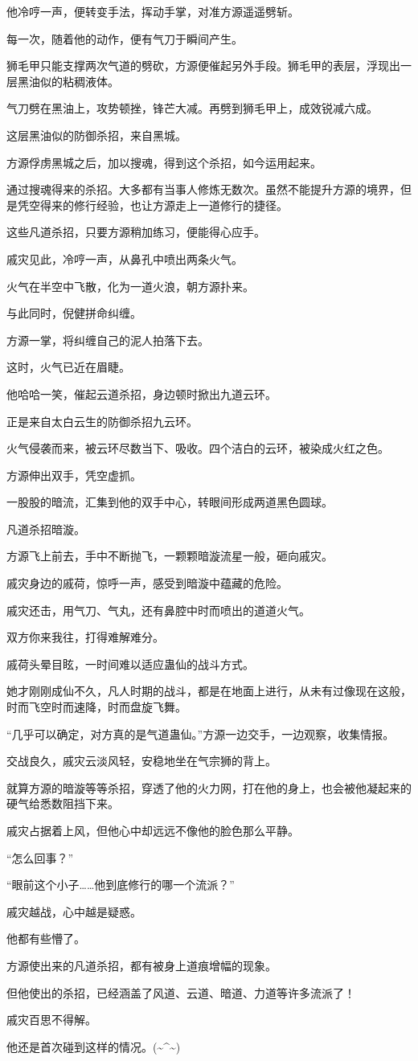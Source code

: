 \begin{this_body}
他冷哼一声，便转变手法，挥动手掌，对准方源遥遥劈斩。

每一次，随着他的动作，便有气刀于瞬间产生。

狮毛甲只能支撑两次气道的劈砍，方源便催起另外手段。狮毛甲的表层，浮现出一层黑油似的粘稠液体。

气刀劈在黑油上，攻势顿挫，锋芒大减。再劈到狮毛甲上，成效锐减六成。

这层黑油似的防御杀招，来自黑城。

方源俘虏黑城之后，加以搜魂，得到这个杀招，如今运用起来。

通过搜魂得来的杀招。大多都有当事人修炼无数次。虽然不能提升方源的境界，但是凭空得来的修行经验，也让方源走上一道修行的捷径。

这些凡道杀招，只要方源稍加练习，便能得心应手。

戚灾见此，冷哼一声，从鼻孔中喷出两条火气。

火气在半空中飞散，化为一道火浪，朝方源扑来。

与此同时，倪健拼命纠缠。

方源一掌，将纠缠自己的泥人拍落下去。

这时，火气已近在眉睫。

他哈哈一笑，催起云道杀招，身边顿时掀出九道云环。

正是来自太白云生的防御杀招九云环。

火气侵袭而来，被云环尽数当下、吸收。四个洁白的云环，被染成火红之色。

方源伸出双手，凭空虚抓。

一股股的暗流，汇集到他的双手中心，转眼间形成两道黑色圆球。

凡道杀招暗漩。

方源飞上前去，手中不断抛飞，一颗颗暗漩流星一般，砸向戚灾。

戚灾身边的戚荷，惊呼一声，感受到暗漩中蕴藏的危险。

戚灾还击，用气刀、气丸，还有鼻腔中时而喷出的道道火气。

双方你来我往，打得难解难分。

戚荷头晕目眩，一时间难以适应蛊仙的战斗方式。

她才刚刚成仙不久，凡人时期的战斗，都是在地面上进行，从未有过像现在这般，时而飞空时而速降，时而盘旋飞舞。

“几乎可以确定，对方真的是气道蛊仙。”方源一边交手，一边观察，收集情报。

交战良久，戚灾云淡风轻，安稳地坐在气宗狮的背上。

就算方源的暗漩等等杀招，穿透了他的火力网，打在他的身上，也会被他凝起来的硬气给悉数阻挡下来。

戚灾占据着上风，但他心中却远远不像他的脸色那么平静。

“怎么回事？”

“眼前这个小子……他到底修行的哪一个流派？”

戚灾越战，心中越是疑惑。

他都有些懵了。

方源使出来的凡道杀招，都有被身上道痕增幅的现象。

但他使出的杀招，已经涵盖了风道、云道、暗道、力道等许多流派了！

戚灾百思不得解。

他还是首次碰到这样的情况。(\~{}\^{}\~{})

\end{this_body}

